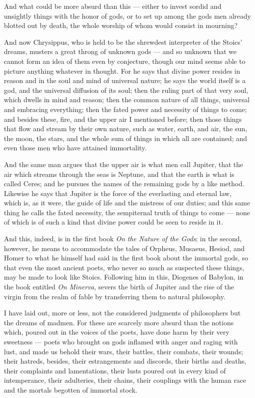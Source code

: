  And what could be more absurd than this — either to invest sordid and unsightly things with the honor of gods, or to set up among the gods men already blotted out by death, the whole worship of whom would consist in mourning?

 And now Chrysippus, who is held to be the shrewdest interpreter of the Stoics' dreams, musters a great throng of unknown gods — and so unknown that we cannot form an idea of them even by conjecture, though our mind seems able to picture anything whatever in thought. For he says that divine power resides in reason and in the soul and mind of universal nature; he says the world itself is a god, and the universal diffusion of its soul; then the ruling part of that very soul, which dwells in mind and reason; then the common nature of all things, universal and embracing everything; then the fated power and necessity of things to come; and besides these, fire, and the upper air I mentioned before; then those things that flow and stream by their own nature, such as water, earth, and air, the sun, the moon, the stars, and the whole sum of things in which all are contained; and even those men who have attained immortality.

 And the same man argues that the upper air is what men call Jupiter, that the air which streams through the seas is Neptune, and that the earth is what is called Ceres; and he pursues the names of the remaining gods by a like method. Likewise he says that Jupiter is the force of the everlasting and eternal law, which is, as it were, the guide of life and the mistress of our duties; and this same thing he calls the fated necessity, the sempiternal truth of things to come — none of which is of such a kind that divine power could be seen to reside in it.

 And this, indeed, is in the first book \textit{On the Nature of the Gods}; in the second, however, he means to accommodate the tales of Orpheus, Musaeus, Hesiod, and Homer to what he himself had said in the first book about the immortal gods, so that even the most ancient poets, who never so much as suspected these things, may be made to look like Stoics. Following him in this, Diogenes of Babylon, in the book entitled \textit{On Minerva}, severs the birth of Jupiter and the rise of the virgin from the realm of fable by transferring them to natural philosophy.

 I have laid out, more or less, not the considered judgments of philosophers but the dreams of madmen. For these are scarcely more absurd than the notions which, poured out in the voices of the poets, have done harm by their very sweetness — poets who brought on gods inflamed with anger and raging with lust, and made us behold their wars, their battles, their combats, their wounds; their hatreds, besides, their estrangements and discords, their births and deaths, their complaints and lamentations, their lusts poured out in every kind of intemperance, their adulteries, their chains, their couplings with the human race and the mortals begotten of immortal stock.


